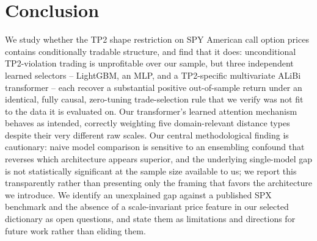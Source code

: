 \documentclass[sigconf,review,anonymous]{acmart}
\begin{document}
\section{Conclusion}
We study whether the TP2 shape restriction on SPY American call option prices contains conditionally tradable structure, and find that it does: unconditional TP2-violation trading is unprofitable over our sample, but three independent learned selectors -- LightGBM, an MLP, and a TP2-specific multivariate ALiBi transformer -- each recover a substantial positive out-of-sample return under an identical, fully causal, zero-tuning trade-selection rule that we verify was not fit to the data it is evaluated on. Our transformer's learned attention mechanism behaves as intended, correctly weighting five domain-relevant distance types despite their very different raw scales. Our central methodological finding is cautionary: naive model comparison is sensitive to an ensembling confound that reverses which architecture appears superior, and the underlying single-model gap is not statistically significant at the sample size available to us; we report this transparently rather than presenting only the framing that favors the architecture we introduce. We identify an unexplained gap against a published SPX benchmark and the absence of a scale-invariant price feature in our selected dictionary as open questions, and state them as limitations and directions for future work rather than eliding them.
\end{document}
